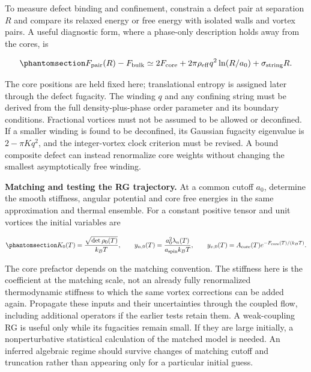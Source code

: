To measure defect binding and confinement, constrain a defect pair at
separation \(R\) and compare its relaxed energy or free energy with
isolated walls and vortex pairs. A useful diagnostic form, where a
phase-only description holds away from the cores, is

\begin{equation}\phantomsection\label{eq-nbcp-matching-defect-pair}{
F_{\rm pair}(R)-F_{\rm bulk}
\simeq 2F_{\rm core}
+2\pi\rho_{\rm eff}q^2\ln(R/a_0)+\sigma_{\rm string}R.
}\end{equation}

The core positions are held fixed here; translational entropy is
assigned later through the defect fugacity. The winding \(q\) and any
confining string must be derived from the full density-plus-phase order
parameter and its boundary conditions. Fractional vortices must not be
assumed to be allowed or deconfined. If a smaller winding is found to be
deconfined, its Gaussian fugacity eigenvalue is \(2-\pi Kq^2\), and the
integer-vortex clock criterion must be revised. A bound composite defect
can instead renormalize core weights without changing the smallest
asymptotically free winding.

\textbf{Matching and testing the RG trajectory.} At a common cutoff
\(a_0\), determine the smooth stiffness, angular potential and core free
energies in the same approximation and thermal ensemble. For a constant
positive tensor and unit vortices the initial variables are

\begin{equation}\phantomsection\label{eq-nbcp-matching-rg-inputs}{
K_0(T)=\frac{\sqrt{\det\rho_0(T)}}{k_BT},\qquad
y_{n,0}(T)=\frac{a_0^2\lambda_n(T)}{a_{\rm spin}k_BT},\qquad
y_{v,0}(T)=A_{\rm core}(T)e^{-F_{\rm core}(T)/(k_BT)}.
}\end{equation}

The core prefactor depends on the matching convention. The stiffness
here is the coefficient at the matching scale, not an already fully
renormalized thermodynamic stiffness to which the same vortex
corrections can be added again. Propagate these inputs and their
uncertainties through the coupled flow, including additional operators
if the earlier tests retain them. A weak-coupling RG is useful only
while its fugacities remain small. If they are large initially, a
nonperturbative statistical calculation of the matched model is needed.
An inferred algebraic regime should survive changes of matching cutoff
and truncation rather than appearing only for a particular initial
guess.

